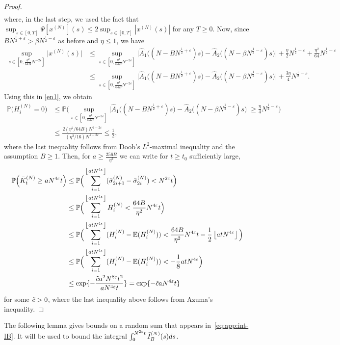 \documentclass[11pt, reqno]{article}
\numberwithin{equation}{section}
\numberwithin{theorem}{section}
\begin{document}
\begin{appendix}
\begin{proof}
\begin{align}
\end{align}
where, in the last step, we used the fact that $\sup_{s \in [0,T]} \Psi[x^{(N)}](s) \le 2 \sup_{s \in [0,T]}|x^{(N)}(s)|$ for any $T \ge 0$.
Now, since $BN^{\frac{1}{2}+\varepsilon}>\beta N^{\frac{1}{2}-\varepsilon}$ as before and $\eta \le 1$, we have
\begin{align*}
\sup_{s\in [0,\frac{\eta^2}{64B}N^{-2\varepsilon}]}\Big|x^{(N)}(s)\Big| &\le \sup_{s\in [0,\frac{\eta^2}{64B}N^{-2\varepsilon}]}\big|\hat{A}_1\big((N-BN^{\frac{1}{2}+\varepsilon})s\big)-\hat{A}_2\big((N-\beta N^{\frac{1}{2}-\varepsilon})s\big)\big| + \frac{\eta}{2}N^{\frac{1}{2}-\varepsilon} + \frac{\eta^2}{64}N^{\frac{1}{2}-\varepsilon}\\
&\le \sup_{s\in [0,\frac{\eta^2}{64B}N^{-2\varepsilon}]}\big|\hat{A}_1\big((N-BN^{\frac{1}{2}+\varepsilon})s\big)-\hat{A}_2\big((N-\beta N^{\frac{1}{2}-\varepsilon})s\big)\big| + \frac{3\eta}{4}N^{\frac{1}{2}-\varepsilon}.
\end{align*}
Using this in \eqref{en1}, we obtain
\begin{align*}
\mathbb{P}\Big(H^{(N)}_i=0\Big)
    &\leq \mathbb{P}\Big(\sup_{s\in [0,\frac{\eta^2}{64B}N^{-2\varepsilon}]}\big|\hat{A}_1\big((N-BN^{\frac{1}{2}+\varepsilon})s\big)-\hat{A}_2\big((N-\beta N^{\frac{1}{2}-\varepsilon})s\big)\big|\geq \frac{\eta}{4}N^{\frac{1}{2}-\varepsilon}\Big)\\
    &\leq \frac{2(\eta^2/64B)N^{1-2\varepsilon}}{(\eta^2/16)N^{1-2\varepsilon}} \le \frac{1}{2},
\end{align*}
where the last inequality follows from Doob's $L^2$-maximal inequality and the assumption $B \ge 1$. Then, for $a\geq \frac{256B}{\eta^2}$ we can write for $t\geq t_0$ sufficiently large,
\begin{align*}
    \mathbb{P}\Big(\bar{K}^{(N)}_t\geq a N^{4\varepsilon}t\Big)&\leq \mathbb{P}\Big(\sum_{i=1}^{\left\lfloor{atN^{4\varepsilon}}\right\rfloor}(\Bar{\sigma}^{(N)}_{2i+1}-\Bar{\sigma}^{(N)}_{2i})<N^{2\varepsilon}t\Big)\\
    &\leq \mathbb{P}\Big(\sum_{i=1}^{\left\lfloor{atN^{4\varepsilon}}\right\rfloor}H^{(N)}_i<\frac{64B}{\eta^2}N^{4\varepsilon}t\Big)\\
    &\leq \mathbb{P}\Big(\sum_{i=1}^{\left\lfloor{atN^{4\varepsilon}}\right\rfloor}(H^{(N)}_i-\mathbb{E}(H^{(N)}_i))<\frac{64B}{\eta^2}N^{4\varepsilon}t-\frac{1}{2}\left\lfloor{atN^{4\varepsilon}}\right\rfloor\Big)\\
    &\leq \mathbb{P}\Big(\sum_{i=1}^{\left\lfloor{atN^{4\varepsilon}}\right\rfloor}(H^{(N)}_i-\mathbb{E}(H^{(N)}_i))<-\frac{1}{8}atN^{4\varepsilon}\Big)\\
    &\leq \exp \{-\frac{\Tilde{c}a^2N^{8\varepsilon}t^2}{aN^{4\varepsilon}t}\}=\exp \{-\Tilde{c}aN^{4\varepsilon}t\}
\end{align*}
for some $\Tilde{c}>0$, where the last inequality above follows from Azuma's inequality. 
\end{proof}
\bigskip
The following lemma gives bounds on a random sum that appears in~\eqref{eq:app:int-IB}. 
It will be used to bound the integral $\int_0^{N^{2\varepsilon}t}\Bar{I}_B^{(N)}(s)ds$.


\end{appendix}
\end{document}
